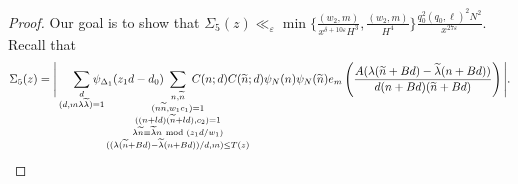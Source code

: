 \documentclass{amsart}
\numberwithin{equation}{section}
\begin{document}
\begin{proof}
Our goal is to show that $\Sigma_5(z) \ll_\varepsilon \min\{\tfrac{(w_2,m)}{x^{\delta+10\varepsilon}H^3}, \tfrac{ (w_2,m)}{H^4}\}\tfrac{q_0^2(q_0,\ell)^2 N^2 }{x^{27\varepsilon}} $.  Recall that 
\begin{align*}
\Sigma_5(z)=\Bigg|\sum_{\substack{d \\   (d,m \lambda \widetilde{\lambda})=1}}\!\!\!\!\!\!\!\psi_{\Delta_1}(z_1d-d_0) \!\!\!\!\!\!\!\!\!\!\!\!\!\!\!\!\!\!\!\!\!\!\!\!\!\!\!\!\!\!\!\sum_{\substack{n, \widetilde{n} \\ (n\widetilde{n},w_1 c_1)=1 \\ ((n+ld)(\widetilde{n}+l d), c_2)=1  \\ \lambda \widetilde{n} \equiv 
\widetilde{\lambda}n  \mbox{ \scriptsize mod } (z_1 d/w_1) \\ ((\lambda (\widetilde{n} +Bd)-\widetilde{\lambda}(n+Bd))/d,m ) \leq T(z)}} \!\!\!\!\!\! \!\!\!\!\!\!\!\!\!\!\!\!\!\!\!\!\!\!\!\!\!\!\!\!\! C(n;d)  C(\widetilde{n};d)\psi_N(n)\psi_N(\widetilde{n}) e_{m}\left(\dfrac{A (\lambda(\widetilde{n}+B d)-  \widetilde{\lambda}(n+B d))}{d(n+B d)(\widetilde{n}+B d)}\right)\Bigg|.
\end{align*}


\end{proof}
\end{document}
